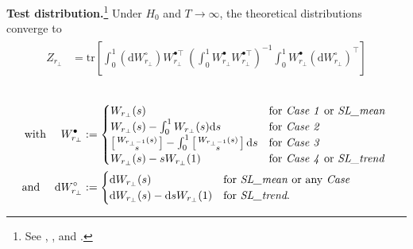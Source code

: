 \textbf{Test distribution.}\footnote{See \citet[Ch.~11.2]{Johansen1996}, \citet[Ch.~8.2]{Lutkepohl2005}, and \citet[p.~24, Eq.~2.9]{Trenkler2008}.} Under $ H_0 $ and $ T \to \infty $, the theoretical distributions converge to
\begin{align} \label{eq:asympDistr}
\begin{split}
	Z_{r_\perp} & = \text{tr} \left[ \int_0^1 \left(\text{d} W^\circ_{r_\perp} \right) W_{r_\perp}^{\bullet \top} \ \left( \int_0^1 W^\bullet_{r_\perp} W_{r_\perp}^{\bullet \top} \right)^{-1} \int_0^1 W^\bullet_{r_\perp} \left(\text{d} W^\circ_{r_\perp}\right)^\top \right]
\end{split}
\end{align}\\[-27pt]
\begin{align} \label{eq:asympDistr2}
\begin{split}
	\text{with \quad} W^\bullet_{r_\perp} & := 
	\begin{cases}
	W_{r_\perp} {\left( s \right)} & \text{for \textit{Case 1} or \textit{SL\_mean} } \\
	W_{r_\perp} {\left( s \right)} - \int_0^1 W_{r_\perp}{\left( s \right)}\text{d} s & \text{for \textit{Case 2} } \\
	\left[ \begin{smallmatrix}
	W_{r_\perp-1} {\left( s \right)} \\ s
	\end{smallmatrix} \right] - \int_0^1 \left[ \begin{smallmatrix}
	W_{r_\perp-1} {\left( s \right)} \\ s
	\end{smallmatrix} \right] \text{d} s & \text{for \textit{Case 3} } \\
	W_{r_\perp} {\left( s \right)} - sW_{r_\perp}{\left( 1 \right)} & \text{for \textit{Case 4} or \textit{SL\_trend}} \\
	\end{cases} \\
	\text{and \quad} \text{d} W^\circ_{r_\perp} & := 
	\begin{cases}
	\text{d} W_{r_\perp} {\left( s \right)} & \text{for \textit{SL\_mean} or any \textit{Case}} \\
	\text{d} W_{r_\perp} {\left( s \right)} - \text{d} sW_{r_\perp}{\left( 1 \right)} & \text{for \textit{SL\_trend}.} \\
\end{cases}
\end{split}
\end{align}
